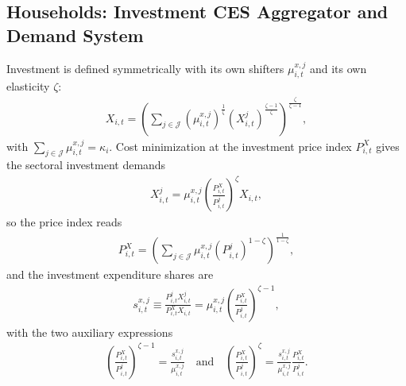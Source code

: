 \documentclass[10pt]{article}
\begin{document}
\subsection*{Households: Investment CES Aggregator and Demand System}
Investment is defined symmetrically with its own shifters $\mu^{x,j}_{i,t}$ and its
own elasticity $\zeta$:
\begin{align}
  X_{i,t} = \left( \sum_{j \in \mathcal{J}} \left(\mu^{x,j}_{i,t}\right)^{\frac{1}{\zeta}}
  \left( X^j_{i,t} \right)^{\frac{\zeta - 1}{\zeta}} \right)^{\frac{\zeta}{\zeta - 1}},
  \label{eq:investagg}
\end{align}
with $\sum_{j \in \mathcal{J}} \mu^{x,j}_{i,t} = \kappa_i$. Cost minimization at the
investment price index $P^{X}_{i,t}$ gives the sectoral investment demands
\begin{align}
  X^j_{i,t} = \mu^{x,j}_{i,t}
  \left( \frac{P^{X}_{i,t}}{P^j_{i,t}} \right)^{\zeta} X_{i,t}, \label{eq:invfoc}
\end{align}
so the price index reads
\begin{align}
  P^{X}_{i,t} = \left( \sum_{j \in \mathcal{J}} \mu^{x,j}_{i,t}
  \left( P^j_{i,t} \right)^{1 - \zeta} \right)^{\frac{1}{1 - \zeta}}, \label{eq:invfinal}
\end{align}
and the investment expenditure shares are
\begin{align}
  s^{x,j}_{i,t} \equiv \frac{P^j_{i,t} X^j_{i,t}}{P^{X}_{i,t} X_{i,t}}
  = \mu^{x,j}_{i,t} \left( \frac{P^{X}_{i,t}}{P^j_{i,t}} \right)^{\zeta - 1}
  , \label{eq:invshares}
\end{align}
with the two auxiliary expressions
\begin{align}
  \left( \frac{P^{X}_{i,t}}{P^j_{i,t}} \right)^{\zeta - 1} = \frac{s^{x,j}_{i,t}}{\mu^{x,j}_{i,t}}
  \quad\text{and}\quad
  \left( \frac{P^{X}_{i,t}}{P^j_{i,t}} \right)^{\zeta}
  = \frac{s^{x,j}_{i,t}}{\mu^{x,j}_{i,t}} \frac{P^{X}_{i,t}}{P^j_{i,t}}. \label{eq:invratio}
\end{align}

\end{document}
